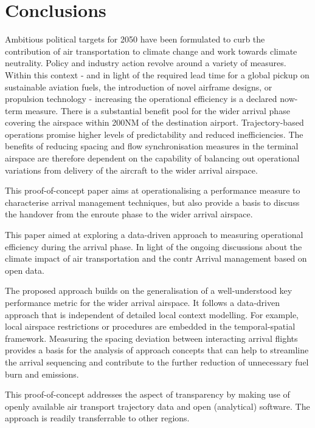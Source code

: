 \documentclass[letterpaper, 10 pt, journal, twoside]{IEEEtran}
\begin{document}
\hypertarget{conclusions}{%
\section{Conclusions}\label{conclusions}}

Ambitious political targets for 2050 have been formulated to curb the
contribution of air transportation to climate change and work towards
climate neutrality. Policy and industry action revolve around a variety
of measures. Within this context - and in light of the required lead
time for a global pickup on sustainable aviation fuels, the introduction
of novel airframe designs, or propulsion technology - increasing the
operational efficiency is a declared now-term measure. There is a
substantial benefit pool for the wider arrival phase covering the
airspace within 200NM of the destination airport. Trajectory-based
operations promise higher levels of predictability and reduced
inefficiencies. The benefits of reducing spacing and flow
synchronisation measures in the terminal airspace are therefore
dependent on the capability of balancing out operational variations from
delivery of the aircraft to the wider arrival airspace.

This proof-of-concept paper aims at operationalising a performance
measure to characterise arrival management techniques, but also provide
a basis to discuss the handover from the enroute phase to the wider
arrival airspace.

This paper aimed at exploring a data-driven approach to measuring
operational efficiency during the arrival phase. In light of the ongoing
discussions about the climate impact of air transportation and the contr
Arrival management based on open data.

The proposed approach builds on the generalisation of a well-understood
key performance metric for the wider arrival airspace. It follows a
data-driven approach that is independent of detailed local context
modelling. For example, local airspace restrictions or procedures are
embedded in the temporal-spatial framework. Measuring the spacing
deviation between interacting arrival flights provides a basis for the
analysis of approach concepts that can help to streamline the arrival
sequencing and contribute to the further reduction of unnecessary fuel
burn and emissions.

This proof-of-concept addresses the aspect of transparency by making use
of openly available air transport trajectory data and open (analytical)
software. The approach is readily transferrable to other regions.
\end{document}
